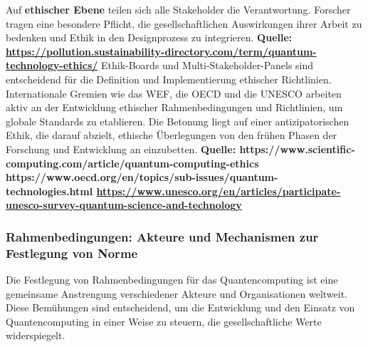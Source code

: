 {Auf \textbf{ethischer Ebene} teilen sich alle Stakeholder die Verantwortung. Forscher tragen eine besondere Pflicht, die gesellschaftlichen Auswirkungen ihrer Arbeit zu bedenken und Ethik in den Designprozess zu integrieren. \textbf{Quelle: \href{https://pollution.sustainability-directory.com/term/quantum-technology-ethics/}{https://pollution.sustainability-directory.com/term/quantum-technology-ethics/}} Ethik-Boards und Multi-Stakeholder-Panels sind entscheidend für die Definition und Implementierung ethischer Richtlinien. Internationale Gremien wie das WEF, die OECD und die UNESCO arbeiten aktiv an der Entwicklung ethischer Rahmenbedingungen und Richtlinien, um globale Standards zu etablieren. Die Betonung liegt auf einer antizipatorischen Ethik, die darauf abzielt, ethische Überlegungen von den frühen Phasen der Forschung und Entwicklung an einzubetten. \textbf{Quelle: https://www.scientific-computing.com/article/quantum-computing-ethics https://www.oecd.org/en/topics/sub-issues/quantum-technologies.html \href{https://www.unesco.org/en/articles/participate-unesco-survey-quantum-science-and-technology}{https://www.unesco.org/en/articles/participate-unesco-survey-quantum-science-and-technology}}

\subsubsection{Rahmenbedingungen: Akteure und Mechanismen zur Festlegung von Norme}
Die Festlegung von Rahmenbedingungen für das Quantencomputing ist eine gemeinsame Anstrengung verschiedener Akteure und Organisationen weltweit. Diese Bemühungen sind entscheidend, um die Entwicklung und den Einsatz von Quantencomputing in einer Weise zu steuern, die gesellschaftliche Werte widerspiegelt.

}
